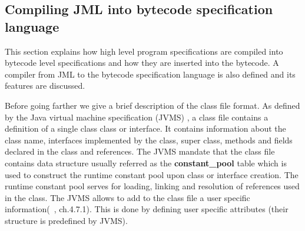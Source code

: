 \subsection{Compiling JML into bytecode specification language}\label{comJML}

This section explains how high level program specifications are compiled into bytecode level specifications and how they are inserted into the bytecode. 
 A compiler from JML to the bytecode specification language is also defined and its features are discussed.


Before going farther we give a brief description of the class file format. As defined by the Java virtual machine  specification (JVMS) \cite{VMSpec}, a class file contains a definition of a single class class or interface. It contains information about the class name, interfaces implemented by the class, super class, methods and fields declared in the class and references. The JVMS mandate that the class file contains data structure usually referred as the \textbf{constant\_pool} table which is used to construct the runtime constant pool upon class or interface creation. The runtime constant pool serves for loading, linking and resolution of references used in the class. The JVMS allows to add to the class file a user specific information(~\cite{VMSpec}, ch.4.7.1). This is done by defining user specific attributes  (their structure is predefined by JVMS).

